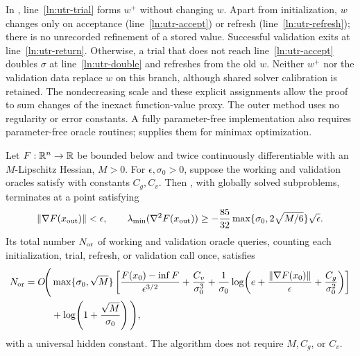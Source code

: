 \documentclass{article}
\begin{document}
In , line~\ref{ln:utr-trial} forms $w^+$
without changing $w$.  Apart from initialization, $w$ changes only
on acceptance (line~\ref{ln:utr-accept}) or refresh
(line~\ref{ln:utr-refresh}); there is no unrecorded refinement of a
stored value.  Successful validation exits at
line~\ref{ln:utr-return}.  Otherwise, a trial that does not reach
line~\ref{ln:utr-accept} doubles $\sigma$ at
line~\ref{ln:utr-double} and refreshes from the old $w$.
Neither $w^+$ nor the validation data replace $w$ on this branch,
although shared solver calibration is retained.  The nondecreasing
scale and these explicit assignments allow the proof to sum changes
of the inexact function-value proxy.
The outer method uses no regularity or error constants.  A fully
parameter-free implementation also requires parameter-free oracle
routines;  supplies them for minimax
optimization.

\begin{theorem}
\label{thm:total-complexity}
Let $F:\mathbb{R}^n\to\mathbb{R}$ be bounded below and twice continuously
differentiable with an $M$-Lipschitz Hessian, $M>0$.
For $\epsilon,\sigma_0>0$, suppose the working and validation
oracles satisfy  with constants $C_g,C_v$.
Then , with globally solved subproblems,
terminates at a point satisfying
\begin{equation}\label{eq:return-guarantee}
 \|\nabla F(x_{\rm out})\|<\epsilon,\qquad
 \lambda_{\min}(\nabla^2F(x_{\rm out}))
 \ge-\frac{85}{32}\max\{\sigma_0,2\sqrt{M/6}\}\sqrt\epsilon.
\end{equation}
Its total number $N_{\rm or}$ of working and validation oracle
queries, counting each initialization, trial, refresh, or validation
call once, satisfies
\begin{equation}\label{eq:utr-total-count}
\begin{aligned}
 N_{\rm or}=O\!\Bigg(&\max\{\sigma_0,\sqrt M\}
 \left[\frac{F(x_0)-\inf F}{\epsilon^{3/2}}
       +\frac{C_v}{\sigma_0^3}
       +\frac1{\sigma_0}\log\!\left(
          e+\frac{\|\nabla F(x_0)\|}{\epsilon}
            +\frac{C_g}{\sigma_0^2}\right)\right]\\
 &+\log\!\left(1+\frac{\sqrt M}{\sigma_0}\right)\Bigg),
\end{aligned}
\end{equation}
with a universal hidden constant.  The algorithm does not require
$M,C_g$, or $C_v$.
\end{theorem}
\end{document}
